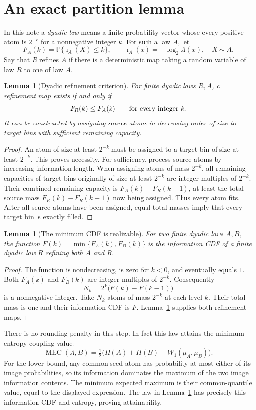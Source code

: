 \documentclass[11pt,a4paper]{article}
\newtheorem{lemma}[theorem]{Lemma}
\newcommand{\Prb}{\mathbb P}
\newcommand{\ii}{\imath}
\newcommand{\MEC}{\operatorname{MEC}}
\begin{document}
\section{An exact partition lemma}
In this note a \emph{dyadic law} means a finite probability vector whose
every positive atom is $2^{-k}$ for a nonnegative integer $k$.
For such a law $A$, let
\[
F_A(k)=\Prb\{\ii_A(X)\le k\},\qquad
\ii_A(x)=-\log_2 A(x),\quad X\sim A.
\]
Say that $R$ refines $A$ if there is a deterministic map taking a random
variable of law $R$ to one of law $A$.

\begin{lemma}[Dyadic refinement criterion]\label{lem:partition}
For finite dyadic laws $R,A$, a refinement map exists if and only if
\[
F_R(k)\le F_A(k)\qquad\hbox{for every integer }k.
\]
It can be constructed by assigning source atoms in decreasing order of
size to target bins with sufficient remaining capacity.
\end{lemma}
\begin{proof}
An atom of size at least $2^{-k}$ must be assigned to a target bin of
size at least $2^{-k}$. This proves necessity.
For sufficiency, process source atoms by increasing information length.
When assigning atoms of mass $2^{-k}$, all remaining capacities of target
bins originally of size at least $2^{-k}$ are integer multiples of
$2^{-k}$. Their combined remaining capacity is
$F_A(k)-F_R(k-1)$, at least the total source mass
$F_R(k)-F_R(k-1)$ now being assigned. Thus every atom fits.
After all source atoms have been assigned, equal total masses imply that
every target bin is exactly filled.
\end{proof}

\begin{lemma}[The minimum CDF is realizable]\label{lem:min}
For two finite dyadic laws $A,B$, the function
$F(k)=\min\{F_A(k),F_B(k)\}$ is the information CDF of a finite dyadic
law $R$ refining both $A$ and $B$.
\end{lemma}
\begin{proof}
The function is nondecreasing, is zero for $k<0$, and eventually equals
$1$. Both $F_A(k)$ and $F_B(k)$ are integer multiples of $2^{-k}$.
Consequently
\[
N_k=2^k\bigl(F(k)-F(k-1)\bigr)
\]
is a nonnegative integer. Take $N_k$ atoms of mass $2^{-k}$ at each
level $k$. Their total mass is one and their information CDF is $F$.
Lemma~\ref{lem:partition} supplies both refinement maps.
\end{proof}

There is no rounding penalty in this step. In fact this law attains the
minimum entropy coupling value:
\[
\MEC(A,B)=\tfrac12\bigl(H(A)+H(B)+W_1(\mu_A,\mu_B)\bigr).
\]
For the lower bound, any common seed atom has probability at most either
of its image probabilities, so its information dominates the maximum of
the two image information contents. The minimum expected maximum is
their common-quantile value, equal to the displayed expression.
The law in Lemma~\ref{lem:min} has precisely this information CDF and
entropy, proving attainability.
\end{document}
